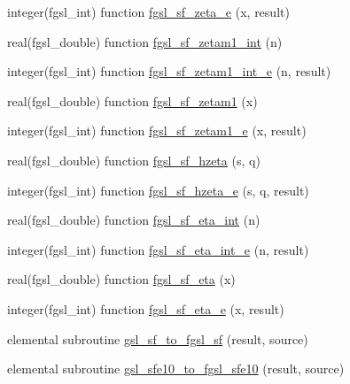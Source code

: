 \begin{DoxyCompactItemize}
\item 
integer(fgsl\-\_\-int) function \hyperlink{specfunc_8finc_a4d4cd10f3d4bdefaf60496978adb455e}{fgsl\-\_\-sf\-\_\-zeta\-\_\-e} (x, result)
\item 
real(fgsl\-\_\-double) function \hyperlink{specfunc_8finc_abb2fd0500d52ae949df6f8a21eca3499}{fgsl\-\_\-sf\-\_\-zetam1\-\_\-int} (n)
\item 
integer(fgsl\-\_\-int) function \hyperlink{specfunc_8finc_a70a3f78f3169bba6f910a9469ee62102}{fgsl\-\_\-sf\-\_\-zetam1\-\_\-int\-\_\-e} (n, result)
\item 
real(fgsl\-\_\-double) function \hyperlink{specfunc_8finc_a9401283d3378c5dd26d0f228441c104f}{fgsl\-\_\-sf\-\_\-zetam1} (x)
\item 
integer(fgsl\-\_\-int) function \hyperlink{specfunc_8finc_af728059dee8d3b74441fc8b39fe80bf9}{fgsl\-\_\-sf\-\_\-zetam1\-\_\-e} (x, result)
\item 
real(fgsl\-\_\-double) function \hyperlink{specfunc_8finc_a06def0fd7fc6ef5a113c86345ccac664}{fgsl\-\_\-sf\-\_\-hzeta} (s, q)
\item 
integer(fgsl\-\_\-int) function \hyperlink{specfunc_8finc_afb41b3e3377e51e351583156fd9c9190}{fgsl\-\_\-sf\-\_\-hzeta\-\_\-e} (s, q, result)
\item 
real(fgsl\-\_\-double) function \hyperlink{specfunc_8finc_aea4cbe49ad0822e1ec94dc6bff365190}{fgsl\-\_\-sf\-\_\-eta\-\_\-int} (n)
\item 
integer(fgsl\-\_\-int) function \hyperlink{specfunc_8finc_a0c3b0e24d1a6bcd28adbe3b233f4ecc2}{fgsl\-\_\-sf\-\_\-eta\-\_\-int\-\_\-e} (n, result)
\item 
real(fgsl\-\_\-double) function \hyperlink{specfunc_8finc_a32b1b6c6849c131cd0b836d6af4a6cae}{fgsl\-\_\-sf\-\_\-eta} (x)
\item 
integer(fgsl\-\_\-int) function \hyperlink{specfunc_8finc_a38802183c57ee1d71a8fe1fbb635a69e}{fgsl\-\_\-sf\-\_\-eta\-\_\-e} (x, result)
\item 
elemental subroutine \hyperlink{specfunc_8finc_ab7a244077f80b9af6ea47fff561ce5b2}{gsl\-\_\-sf\-\_\-to\-\_\-fgsl\-\_\-sf} (result, source)
\item 
elemental subroutine \hyperlink{specfunc_8finc_ad836c9890e9d3696c58e0fe5e1d4f117}{gsl\-\_\-sfe10\-\_\-to\-\_\-fgsl\-\_\-sfe10} (result, source)
\end{DoxyCompactItemize}


